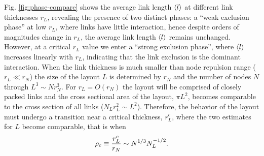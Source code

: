 \documentclass[nofootinbib,preprint,floatfix,endfloats]{revtex4} %
\begin{document}
Fig. \ref{fig:phase-compare} shows the average link length $\left<l\right>$ 
at different link thicknesses $r_L$, revealing the presence of two distinct phases: a ``weak exclusion phase'' at low $r_L$, where links have little interaction, hence despite orders of magnitudes change in $r_L$, the average link length $\left<l\right>$ remains unchanged. However, at a critical $r_L$ value we enter a ``strong exclusion phase'', where $\left<l\right>$ increases linearly with $r_L$, indicating that the link exclusion is the dominant interaction. 
When the link thickness is much smaller than node repulsion range ($r_L\ll r_N$) the size of the layout $L$ is determined by $r_N$ and the number of nodes $N$ through
$ L^3 \sim Nr_N^3 $. %
For $r_L = O(r_N)$ %
the layout will be comprised of closely packed links and the cross sectional area of the layout, $\pi L^2$, becomes comparable to the cross section of all links ($ N_L r_L^2 \sim L^2$). %
Therefore, the behavior of the layout must undergo a transition near a critical thickness, $r^c_L$, where the two estimates for $L$ become comparable, that is when 
\begin{equation}
    \rho_c \equiv {r^c_L\over r_N} \sim N^{1/3} N_L^{-1/2}. \label{eq:trans}
\end{equation}
\end{document}
